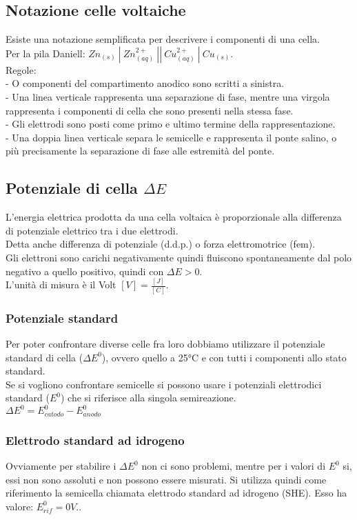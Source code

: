 \subsection{Notazione celle voltaiche}
Esiste una notazione semplificata per descrivere i componenti di una cella.\\
Per la pila Daniell: $Zn_{(s)}\ |\ Zn_{(aq)}^{2+}\ ||\ Cu_{(aq)}^{2+}\ |\ Cu_{(s)}$.\\
Regole:\\
\tab- O componenti del compartimento anodico sono scritti a sinistra.\\
\tab- Una linea verticale rappresenta una separazione di fase, mentre una virgola rappresenta i componenti di cella che sono presenti nella stessa fase.\\
\tab- Gli elettrodi sono posti come primo e ultimo termine della rappresentazione.\\
\tab- Una doppia linea verticale separa le semicelle e rappresenta il ponte salino, o più precisamente la separazione di fase alle estremità del ponte.\\
\subsection{Potenziale di cella $\Delta E$}
L'energia elettrica prodotta da una cella voltaica è proporzionale alla differenza di potenziale elettrico tra i due elettrodi.\\
Detta anche differenza di potenziale (d.d.p.) o forza elettromotrice (fem).\\
Gli elettroni sono carichi negativamente quindi fluiscono spontaneamente dal polo negativo a quello positivo, quindi con $\Delta E > 0$.\\
L'unità di misura è il Volt $[V] = \frac{[J]}{[C]}$.\\
\subsubsection{Potenziale standard}
Per poter confrontare diverse celle fra loro dobbiamo utilizzare il potenziale standard di cella ($\Delta E^0$), ovvero quello a 25°C e con tutti i componenti allo stato standard.\\
Se si vogliono confrontare semicelle si possono usare i potenziali elettrodici standard ($E^0$) che si riferisce alla singola semireazione.\\
$\Delta E^0 = E_{catodo}^0 - E_{anodo}^0$
\subsubsection{Elettrodo standard ad idrogeno}
Ovviamente per stabilire i $\Delta E^0$ non ci sono problemi, mentre per i valori di $E^0$ si, essi non sono assoluti e non possono essere misurati. Si utilizza quindi come riferimento la semicella chiamata elettrodo standard ad idrogeno (SHE).
Esso ha valore: $E_{rif}^0 = 0V.$.\\
